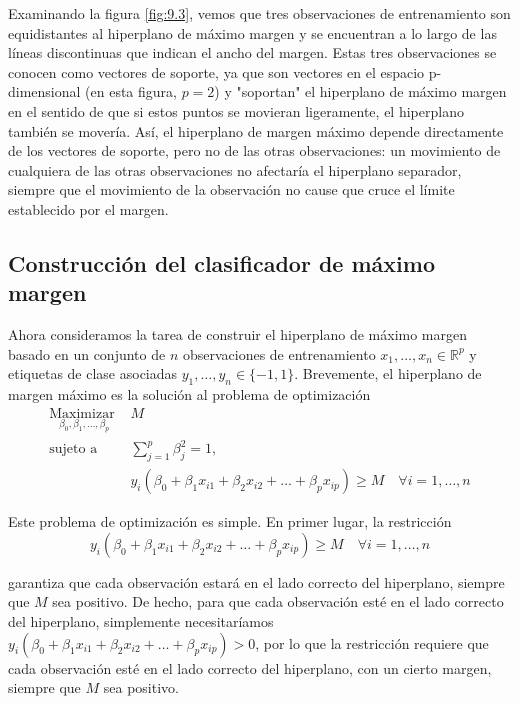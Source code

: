 Examinando la figura \ref{fig:9.3}, vemos que tres observaciones de entrenamiento son equidistantes al hiperplano de máximo margen y se encuentran a lo largo de las líneas discontinuas que indican el ancho del margen. Estas tres observaciones se conocen como vectores de soporte, ya que son vectores en el espacio p-dimensional (en esta figura, $p = 2$) y "soportan" el hiperplano de máximo margen en el sentido de que si estos puntos se movieran ligeramente, el hiperplano también se movería. Así, el hiperplano de margen máximo depende directamente de los vectores de soporte, pero no de las otras observaciones: un movimiento de cualquiera de las otras observaciones no afectaría el hiperplano separador, siempre que el movimiento de la observación no cause que cruce el límite establecido por el margen. \\

\subsection{Construcción del clasificador de máximo margen}

Ahora consideramos la tarea de construir el hiperplano de máximo margen basado en un conjunto de $n$ observaciones de entrenamiento $x_1, \ldots, x_n \in \mathbb{R}^p$ y etiquetas de clase asociadas $y_1, \ldots, y_n \in \{-1, 1\}$. Brevemente, el hiperplano de margen máximo es la solución al problema de optimización
\begin{align}
\underset{\beta_0, \beta_1, \ldots, \beta_p}{\text{Maximizar }} & M \label{eq:9.9}\\
\text{sujeto a } & \sum_{j = 1}^{p} \beta_j^2 = 1, \label{eq:9.10}\\
& y_i (\beta_0 + \beta_1 x_{i1} + \beta_2 x_{i2} + \ldots + \beta_p x_{ip}) \geq M \quad \forall i = 1, \ldots, n \label{eq:9.11}
\end{align}

\noindent Este problema de optimización es simple. En primer lugar, la restricción 
\begin{equation}
y_i (\beta_0 + \beta_1 x_{i1} + \beta_2 x_{i2} + \ldots + \beta_p x_{ip}) \geq M \quad \forall i = 1, \ldots, n
\end{equation}

garantiza que cada observación estará en el lado correcto del hiperplano, siempre que $M$ sea positivo. De hecho, para que cada observación esté en el lado correcto del hiperplano, simplemente necesitaríamos $y_i (\beta_0 + \beta_1 x_{i1} + \beta_2 x_{i2} + \ldots + \beta_p x_{ip}) > 0$, por lo que la restricción requiere que cada observación esté en el lado correcto del hiperplano, con un cierto margen, siempre que $M$ sea positivo. \\

